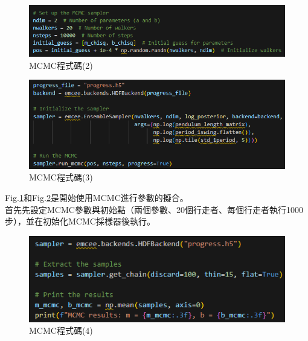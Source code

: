 \documentclass[12pt,a4paper]{article}
\begin{document}
\begin{CJK}{UTF8}{bkai}
\begin{figure}[h]
    \centering
    \includegraphics[width=1\linewidth]{MCMC2.png}
    \caption{MCMC程式碼(2)}
    \label{Fig.MCMC2}
\end{figure}
\begin{figure}[h]
    \centering
    \includegraphics[width=1\linewidth]{MCMC3.png}
    \caption{MCMC程式碼(3)}
    \label{fig:MCMC3}
\end{figure}

\indent Fig.\ref{Fig.MCMC2}和Fig.\ref{fig:MCMC3}是開始使用MCMC進行參數的擬合。\\
\indent 首先先設定MCMC參數與初始點（兩個參數、20個行走者、每個行走者執行1000步），並在初始化MCMC採樣器後執行。

\clearpage

\begin{figure}[h]
    \centering
    \includegraphics[width=1\linewidth]{MCMC4.png}
    \caption{MCMC程式碼(4)}
    \label{fig:MCMC4}
\end{figure}


\end{CJK}
\end{document}

